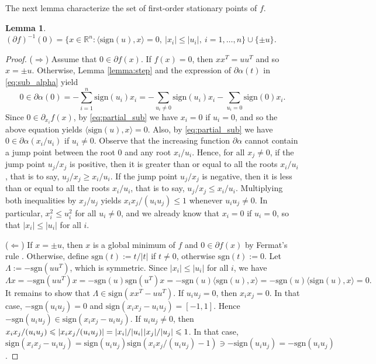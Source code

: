 \documentclass[12pt]{article}
\theoremstyle{definition}
\theoremstyle{plain}
\newtheorem{lemma}{Lemma}
\begin{document}
The next lemma characterize the set of first-order stationary points of $f$.
\begin{lemma}
\label{lemma:stationary}
$(\partial f)^{-1}(0) = \{ x \in \mathbb{R}^n : \langle \mathrm{sign}(u),x\rangle  = 0 , ~|x_i| \leqslant |u_i| , ~ i =1 , \hdots, n \} \cup \{\pm u\}$.
\end{lemma}
\begin{proof} ($\Longrightarrow$)
Assume that $0 \in \partial f(x)$. If $f(x) = 0$, then $xx^T = uu^T$ and so $x = \pm u$. Otherwise, Lemma \ref{lemma:step} and the expression of $\partial \alpha (t)$ in \eqref{eq:sub_alpha} yield
\begin{equation*}
        0 \in \partial \alpha(0) = -\sum_{i=1}^n  \mathrm{sign}(u_i)x_i = -\sum_{u_i\neq 0} \mathrm{sign}(u_i)x_i - \sum_{u_i = 0} \mathrm{sign}(0)x_i.
\end{equation*}
Since $0 \in \partial_{x_i} f(x)$, by \eqref{eq:partial_sub} we have $x_i = 0$ if $u_i = 0$, and so the above equation yields $\langle \mathrm{sign}(u),x\rangle = 0$. Also, by \eqref{eq:partial_sub} we have $0 \in \partial \alpha (x_i/u_i)$ if $u_i\neq 0$. Observe that the increasing function $\partial \alpha$ cannot contain a jump point between the root $0$ and any root $x_i/u_i$. Hence, for all $x_j \neq 0$, if the jump point $u_j/x_j$ is positive, then it is greater than or equal to all the roots $x_i/u_i$, that is to say, $u_j/x_j \geqslant x_i/u_i$. If the jump point $u_j/x_j$ is negative, then it is less than or equal to all the roots $x_i/u_i$, that is to say, $u_j/x_j \leqslant x_i/u_i$. Multiplying both inequalities by $x_j/u_j$ yields $x_ix_j/(u_iu_j) \leqslant 1$ whenever $u_iu_j \neq 0$. In particular, $x_i^2 \leqslant u_i^2$ for all $u_i\neq 0$, and we already know that $x_i = 0$ if $u_i = 0$, so that $|x_i|\leqslant |u_i|$ for all $i$.

($\Longleftarrow$) If $x = \pm u$, then $x$ is a global minimum of $f$ and $0 \in \partial f(x)$ by Fermat's rule \cite[Theorem 10.1]{rockafellar2009variational}. Otherwise, define $\mathrm{sgn}(t) := t/|t|$ if $t\neq 0$, otherwise $\mathrm{sgn}(t) := 0$. Let $\Lambda := -\mathrm{sgn}(uu^T)$, which is symmetric. Since $|x_i| \leqslant |u_i|$ for all $i$, we have 
\begin{equation*}
    \Lambda x =  -\mathrm{sgn}(uu^T)x = -\mathrm{sgn}(u)\mathrm{sgn}(u^T)x =  -\mathrm{sgn}(u) \langle\mathrm{sgn}(u),x\rangle =  -\mathrm{sgn}(u) \langle\mathrm{sign}(u),x\rangle = 0.
\end{equation*}
It remains to show that $\Lambda \in \mathrm{sign}(xx^T-uu^T)$. If $u_iu_j=0$, then $x_ix_j = 0$. In that case, $-\mathrm{sgn}(u_iu_j) = 0$ and $\mathrm{sign}(x_ix_j-u_iu_j) = [-1,1]$. Hence $-\mathrm{sgn}(u_iu_j) \in \mathrm{sign}(x_ix_j-u_iu_j)$. If $u_iu_j \neq 0$, then $x_ix_j/(u_iu_j) \leqslant |x_ix_j/(u_iu_j)| = |x_i|/|u_i| \hspace*{.3mm} |x_j|/|u_j| \leqslant 1$. In that case, $\mathrm{sign}(x_ix_j-u_iu_j) = \mathrm{sign}(u_iu_j)\mathrm{sign}(x_ix_j/(u_iu_j)-1) \ni -\mathrm{sign}(u_iu_j)  = -\mathrm{sgn}(u_iu_j)$.
\end{proof}
\end{document}
